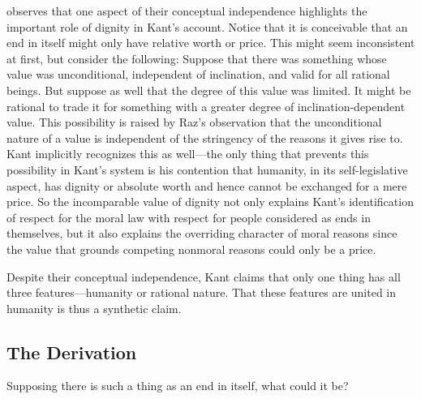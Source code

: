 \documentclass[a4paper,12pt]{article}
\begin{document}
\citet{Wood:1999zy} observes that one aspect of their conceptual independence highlights the important role of dignity in Kant's account. Notice that it is conceivable that an end in itself might only have relative worth or price. This might seem inconsistent at first, but consider the following: Suppose that there was something whose value was unconditional, independent of inclination, and valid for all rational beings. But suppose as well that the degree of this value was limited. It might be rational to trade it for something with a greater degree of inclination-dependent value. This possibility is raised by Raz's \citeyearpar{Raz:2001ps} observation that the unconditional nature of a value is independent of the stringency of the reasons it gives rise to. Kant implicitly recognizes this as well---the only thing that prevents this possibility in Kant's system is his contention that humanity, in its self-legislative aspect, has dignity or absolute worth and hence cannot be exchanged for a mere price. So the incomparable value of dignity not only explains Kant's identification of respect for the moral law with respect for people considered as ends in themselves, but it also explains the overriding character of moral reasons since the value that grounds competing nonmoral reasons could only be a price.

Despite their conceptual independence, Kant claims that only one thing has all three features---humanity or rational nature. That these features are united in humanity is thus a synthetic claim.


\subsection{The Derivation} \label{sub:the_derivation} %

Supposing there is such a thing as an end in itself, what could it be? 
\end{document}
